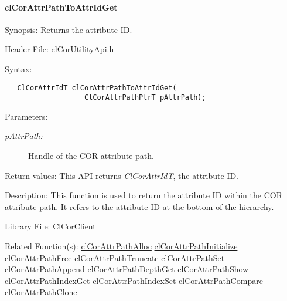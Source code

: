 \hypertarget{pagecor263}{}\paragraph{cl\-Cor\-Attr\-Path\-To\-Attr\-Id\-Get}\label{pagecor263}
\begin{Desc}
\item[Synopsis:]Returns the attribute ID.\end{Desc}
\begin{Desc}
\item[Header File:]\hyperlink{cl_cor_utility_api_8h}{cl\-Cor\-Utility\-Api.h}\end{Desc}
\begin{Desc}
\item[Syntax:]

\footnotesize\begin{verbatim}   ClCorAttrIdT clCorAttrPathToAttrIdGet(
                   ClCorAttrPathPtrT pAttrPath);
\end{verbatim}
\normalsize
\end{Desc}
\begin{Desc}
\item[Parameters:]
\begin{description}
\item[{\em p\-Attr\-Path:}]Handle of the COR attribute path.\end{description}
\end{Desc}
\begin{Desc}
\item[Return values:]This API returns {\em Cl\-Cor\-Attr\-Id\-T\/}, the attribute ID.\end{Desc}
\begin{Desc}
\item[Description:]This function is used to return the attribute ID within the COR attribute path. It refers to the attribute ID at the bottom of the hierarchy.\end{Desc}
\begin{Desc}
\item[Library File:]Cl\-Cor\-Client\end{Desc}
\begin{Desc}
\item[Related Function(s):]\hyperlink{group__group13}{cl\-Cor\-Attr\-Path\-Alloc} \hyperlink{group__group13}{cl\-Cor\-Attr\-Path\-Initialize} \hyperlink{group__group13}{cl\-Cor\-Attr\-Path\-Free} \hyperlink{group__group13}{cl\-Cor\-Attr\-Path\-Truncate} \hyperlink{group__group13}{cl\-Cor\-Attr\-Path\-Set} \hyperlink{group__group13}{cl\-Cor\-Attr\-Path\-Append} \hyperlink{group__group13}{cl\-Cor\-Attr\-Path\-Depth\-Get} \hyperlink{group__group13}{cl\-Cor\-Attr\-Path\-Show} \hyperlink{group__group13}{cl\-Cor\-Attr\-Path\-Index\-Get} \hyperlink{group__group13}{cl\-Cor\-Attr\-Path\-Index\-Set} \hyperlink{group__group13}{cl\-Cor\-Attr\-Path\-Compare} \hyperlink{group__group13}{cl\-Cor\-Attr\-Path\-Clone} \end{Desc}

